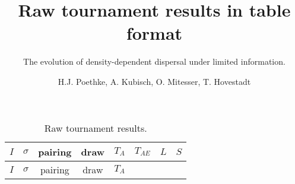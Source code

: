 \documentclass[]{article}
\title{Raw tournament results in table format}
\subtitle{The evolution of density-dependent dispersal under limited information.}
\author{H.J. Poethke, A. Kubisch, O. Mitesser, T. Hovestadt}
\date{}
\begin{document}
\maketitle

\renewcommand\thetable{S\arabic{table}} 

\begin{longtable}[]{@{}cccccccc@{}}
\caption{Raw tournament results.}\tabularnewline
\toprule
\begin{minipage}[b]{0.04\columnwidth}\centering\strut
$I$
\strut\end{minipage} &
\begin{minipage}[b]{0.09\columnwidth}\centering\strut
$\sigma$
\strut\end{minipage} &
\begin{minipage}[b]{0.11\columnwidth}\centering\strut
pairing
\strut\end{minipage} &
\begin{minipage}[b]{0.08\columnwidth}\centering\strut
draw
\strut\end{minipage} &
\begin{minipage}[b]{0.05\columnwidth}\centering\strut
$T_A$
\strut\end{minipage} &
\begin{minipage}[b]{0.07\columnwidth}\centering\strut
$T_{AE}$
\strut\end{minipage} &
\begin{minipage}[b]{0.04\columnwidth}\centering\strut
$L$
\strut\end{minipage} &
\begin{minipage}[b]{0.04\columnwidth}\centering\strut
$S$
\strut\end{minipage}\tabularnewline
\midrule
\endfirsthead
\toprule
\begin{minipage}[b]{0.04\columnwidth}\centering\strut
$I$
\strut\end{minipage} &
\begin{minipage}[b]{0.09\columnwidth}\centering\strut
$\sigma$
\strut\end{minipage} &
\begin{minipage}[b]{0.11\columnwidth}\centering\strut
pairing
\strut\end{minipage} &
\begin{minipage}[b]{0.08\columnwidth}\centering\strut
draw
\strut\end{minipage} &
\begin{minipage}[b]{0.05\columnwidth}\centering\strut
$T_A$
\strut\end{minipage} &
\begin{minipage}[b]{0.07\columnwidth}\centering\strut

\end{minipage}
\end{longtable}
\end{document}
